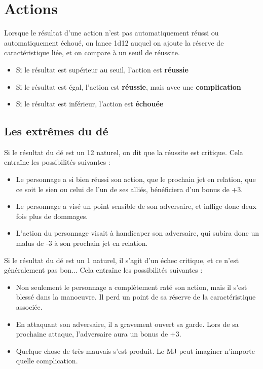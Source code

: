 \documentclass[a4paper,10pt,twoside,twocolumn,openany,bg=print]{dndbook}
\begin{document}
\section{Actions}

Lorsque le résultat d'une action n'est pas automatiquement réussi ou automatiquement échoué, on lance 1d12 auquel on ajoute la réserve de caractéristique liée, et on compare à un seuil de réussite. 

\begin{itemize}
	\item Si le résultat est supérieur au seuil, l'action est \textbf{réussie}
	\item Si le résultat est égal, l'action est \textbf{réussie}, mais avec une \textbf{complication}
	\item Si le résultat est inférieur, l'action est \textbf{échouée}
\end{itemize}

\subsection*{Les extrêmes du dé}

Si le résultat du dé est un 12 naturel, on dit que la réussite est critique. Cela entraîne les possibilités suivantes :

\begin{itemize}
	\item Le personnage a si bien réussi son action, que le prochain jet en relation, que ce soit le sien ou celui de l'un de ses alliés, bénéficiera d'un bonus de +3.
	\item Le personnage a visé un point sensible de son adversaire, et inflige donc deux fois plus de dommages.
	\item L'action du personnage visait à handicaper son adversaire, qui subira donc un malus de -3 à son prochain jet en relation.
\end{itemize}

Si le résultat du dé est un 1 naturel, il s'agit d'un échec critique, et ce n'est généralement pas bon... Cela entraîne les possibilités suivantes :

\begin{itemize}
	\item Non seulement le personnage a complètement raté son action, mais il s'est blessé dans la manoeuvre. Il perd un point de sa réserve de la caractéristique associée.
	\item En attaquant son adversaire, il a gravement ouvert sa garde. Lors de sa prochaine attaque, l'adversaire aura un bonus de +3.
	\item Quelque chose de très mauvais s'est produit. Le MJ peut imaginer n'importe quelle complication.
\end{itemize}
\end{document}
